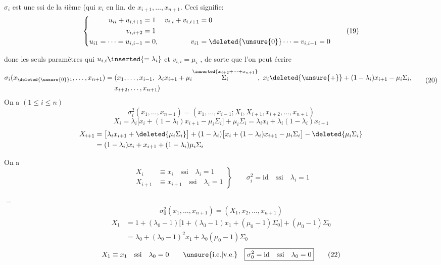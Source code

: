 $\sigma_i$ est une  ssi  de la $i$ième (qui  $x_i$ en  lin. de $x_{i+1},\ldots,x_{n+1}$. Ceci signifie:
\[
\left\{\begin{aligned}
u_{ii}+u_{i,i+1}&=1&v_{i,i}+v_{i,i+1}&=0\\
v_{i,i+2}&=1\\
u_{i1}=\cdots=u_{i,i-1}&=0,&v_{i1}&=\deleted{\unsure{0}}\cdots=v_{i,i-1}=0
\end{aligned}\right.
\tag*{(19)}
\]

donc les seuls paramètres qui   $u_{i,i}\inserted{=\lambda_i}$ et $v_{i,i}=\mu_i$ , de sorte que l'on peut écrire
\[
\begin{aligned}
\sigma_i(x_{\deleted{\unsure{0}}1},\ldots,x_{n+1})={}&(x_1,\ldots,x_{i-1},\ \lambda_i x_{i+1}+\mu_i\overset{\inserted{x_{i+2}+\cdots+x_{n+1}}}{\Sigma_i},\ x_i\deleted{\unsure{+}}+(1-\lambda_i)x_{i+1}-\mu_i\Sigma_i,\\
&x_{i+2},\ldots,x_{n+1})
\end{aligned}
\tag*{(20)}
\]
On a $(1\leq i\leq n)$
\[
\sigma_i^2(x_1,\ldots,x_{n+1})=(x_1,\ldots,x_{i-1};X_i,X_{i+1},x_{i+2},\ldots,x_{n+1})
\]
\[
X_i=\lambda_i\bigl[x_i+(1-\lambda_i)x_{i+1}-\mu_i\Sigma_i\bigr]+\mu_i\Sigma_i
=\lambda_i x_i+\lambda_i(1-\lambda_i)x_{i+1}
\]
\[
\begin{aligned}
X_{i+1}&=\bigl[\lambda_i x_{i+1}+\deleted{\mu_i\Sigma_i}\bigr]+(1-\lambda_i)\bigl[x_i+(1-\lambda_i)x_{i+1}-\mu_i\Sigma_i\bigr]-\deleted{\mu_i\Sigma_i}\\
&=(1-\lambda_i)x_i+x_{i+1}+(1-\lambda_i)\mu_i\Sigma_i
\end{aligned}
\]

On a
\[
\left.\begin{aligned}
X_i&\equiv x_i\quad\text{ssi}\quad\lambda_i=1\\
X_{i+1}&\equiv x_{i+1}\quad\text{ssi}\quad\lambda_i=1
\end{aligned}\right\}
\qquad\boxed{\sigma_i^2=\mathrm{id}\quad\text{ssi}\quad\lambda_i=1}
\tag*{(21)}
\]

 $=$
\[
\sigma_0^2(x_1,\ldots,x_{n+1})=(X_1,x_2,\ldots,x_{n+1})
\]
\[
\begin{aligned}
X_1&=1+(\lambda_0-1)\bigl[1+(\lambda_0-1)x_1+(\mu_0-1)\Sigma_0\bigr]+(\mu_0-1)\Sigma_0\\
&=\lambda_0+(\lambda_0-1)^2x_1+\lambda_0(\mu_0-1)\Sigma_0
\end{aligned}
\]
\[
X_1\equiv x_1\quad\text{ssi}\quad\lambda_0=0\qquad\text{\unsure{i.e.|v.e.}}\quad
\boxed{\sigma_0^2=\mathrm{id}\quad\text{ssi}\quad\lambda_0=0}
\tag*{(22)}
\]

